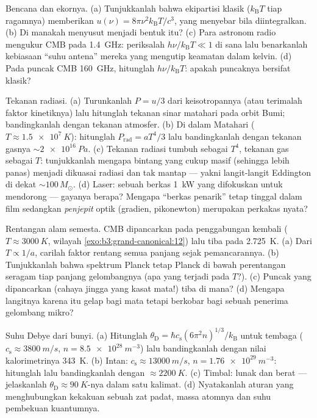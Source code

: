 \begin{exercise}[$\star$]\label{exo:b3:photons-phonons:4}
Bencana dan ekornya. (a) Tunjukkanlah bahwa ekipartisi klasik
($k_{\text{B}}T$ tiap ragamnya) memberikan $u(\nu) =
8\pi\nu^2k_{\text{B}}T/c^3$, yang menyebar bila diintegralkan. (b) Di
manakah  menyusut menjadi bentuk itu? (c) Para astronom
radio mengukur CMB pada \qty{1.4}{GHz}: periksalah $h\nu/k_{\text{B}}T \ll 1$ di sana lalu
benarkanlah kebiasaan ``suhu antena'' mereka yang mengutip keamatan
dalam kelvin. (d) Pada puncak CMB \qty{160}{GHz}, hitunglah
$h\nu/k_{\text{B}}T$: apakah puncaknya bersifat klasik?
\end{exercise}

\begin{exercise}[$\star\star$]\label{exo:b3:photons-phonons:5}
Tekanan radiasi. (a) Turunkanlah $P = u/3$ dari keisotropannya (atau
terimalah faktor kinetiknya) lalu hitunglah tekanan sinar matahari pada
orbit Bumi; bandingkanlah dengan tekanan atmosfer. (b) Di dalam
Matahari ($T \approx \qty{1.5e7}{K}$): hitunglah $P_{\text{rad}} =
aT^4/3$ lalu bandingkanlah dengan tekanan gasnya $\sim\qty{2e16}{Pa}$.
(c) Tekanan radiasi tumbuh sebagai $T^4$, tekanan gas sebagai $T$:
tunjukkanlah mengapa bintang yang cukup masif (sehingga lebih panas)
menjadi dikuasai radiasi dan tak mantap --- yakni langit-langit
Eddington di dekat
$\sim100\,M_\odot$. (d) Laser: sebuah berkas \qty{1}{kW} yang difokuskan
untuk mendorong --- gayanya berapa? Mengapa ``berkas penarik'' tetap
tinggal dalam film sedangkan \emph{penjepit} optik (gradien, pikonewton)
merupakan perkakas nyata?
\end{exercise}

\begin{exercise}[$\star\star$]\label{exo:b3:photons-phonons:6}
Rentangan alam semesta. CMB dipancarkan pada penggabungan kembali
($T \approx \qty{3000}{K}$, wilayah \cref{exo:b3:grand-canonical:12})
lalu tiba pada \qty{2.725}{K}. (a) Dari $T \propto
1/a$, carilah faktor rentang semua panjang sejak pemancarannya. (b)
Tunjukkanlah bahwa spektrum Planck tetap Planck di bawah perentangan
seragam tiap panjang gelombangnya (apa yang terjadi pada $T$?). (c)
Puncak yang dipancarkan (cahaya jingga yang kasat mata!) tiba di mana?
(d) Mengapa langitnya karena itu gelap bagi mata tetapi berkobar bagi
sebuah penerima gelombang mikro?
\end{exercise}

\begin{exercise}[$\star\star$]\label{exo:b3:photons-phonons:7}
Suhu Debye dari bunyi. (a) Hitunglah $\theta_{\text{D}} =
\hbar c_{\text{s}}(6\pi^2n)^{1/3}/k_{\text{B}}$ untuk tembaga
($c_{\text{s}} \approx \qty{3800}{m/s}$, $n =
\qty{8.5e28}{m^{-3}}$) lalu bandingkanlah dengan nilai kalorimetrinya
\qty{343}{K}. (b) Intan: $c_{\text{s}} \approx
\qty{13000}{m/s}$, $n = \qty{1.76e29}{m^{-3}}$: hitunglah lalu
bandingkanlah dengan $\approx\qty{2200}{K}$. (c) Timbal: lunak dan berat
--- jelaskanlah $\theta_{\text{D}} \approx \qty{90}{K}$-nya dalam satu
kalimat. (d) Nyatakanlah aturan yang menghubungkan kekakuan sebuah zat
padat, massa atomnya dan suhu pembekuan kuantumnya.
\end{exercise}


